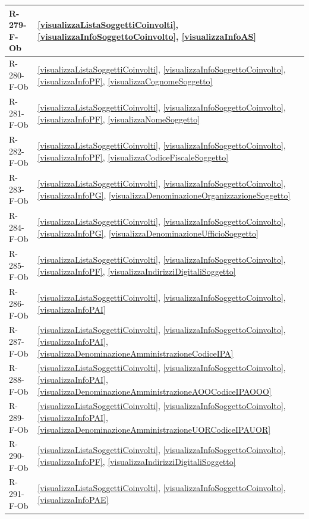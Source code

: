 \begin{longtable}{|p{4cm}|p{10cm}|}
\hline
R-279-F-Ob & \ref{visualizzaListaSoggettiCoinvolti}, \ref{visualizzaInfoSoggettoCoinvolto}, \ref{visualizzaInfoAS} \\
\hline
R-280-F-Ob & \ref{visualizzaListaSoggettiCoinvolti}, \ref{visualizzaInfoSoggettoCoinvolto}, \ref{visualizzaInfoPF}, \ref{visualizzaCognomeSoggetto} \\
\hline
R-281-F-Ob & \ref{visualizzaListaSoggettiCoinvolti}, \ref{visualizzaInfoSoggettoCoinvolto}, \ref{visualizzaInfoPF}, \ref{visualizzaNomeSoggetto} \\
\hline
R-282-F-Ob & \ref{visualizzaListaSoggettiCoinvolti}, \ref{visualizzaInfoSoggettoCoinvolto}, \ref{visualizzaInfoPF}, \ref{visualizzaCodiceFiscaleSoggetto} \\
\hline
R-283-F-Ob & \ref{visualizzaListaSoggettiCoinvolti}, \ref{visualizzaInfoSoggettoCoinvolto}, \ref{visualizzaInfoPG}, \ref{visualizzaDenominazioneOrganizzazioneSoggetto} \\
\hline
R-284-F-Ob & \ref{visualizzaListaSoggettiCoinvolti}, \ref{visualizzaInfoSoggettoCoinvolto}, \ref{visualizzaInfoPG}, \ref{visualizzaDenominazioneUfficioSoggetto} \\
\hline
R-285-F-Ob & \ref{visualizzaListaSoggettiCoinvolti}, \ref{visualizzaInfoSoggettoCoinvolto}, \ref{visualizzaInfoPF}, \ref{visualizzaIndirizziDigitaliSoggetto} \\
\hline
R-286-F-Ob & \ref{visualizzaListaSoggettiCoinvolti}, \ref{visualizzaInfoSoggettoCoinvolto}, \ref{visualizzaInfoPAI} \\
\hline
R-287-F-Ob & \ref{visualizzaListaSoggettiCoinvolti}, \ref{visualizzaInfoSoggettoCoinvolto}, \ref{visualizzaInfoPAI}, \ref{visualizzaDenominazioneAmministrazioneCodiceIPA} \\
\hline
R-288-F-Ob & \ref{visualizzaListaSoggettiCoinvolti}, \ref{visualizzaInfoSoggettoCoinvolto}, \ref{visualizzaInfoPAI}, \ref{visualizzaDenominazioneAmministrazioneAOOCodiceIPAOOO} \\
\hline
R-289-F-Ob & \ref{visualizzaListaSoggettiCoinvolti}, \ref{visualizzaInfoSoggettoCoinvolto}, \ref{visualizzaInfoPAI}, \ref{visualizzaDenominazioneAmministrazioneUORCodiceIPAUOR} \\
\hline
R-290-F-Ob & \ref{visualizzaListaSoggettiCoinvolti}, \ref{visualizzaInfoSoggettoCoinvolto}, \ref{visualizzaInfoPF}, \ref{visualizzaIndirizziDigitaliSoggetto} \\
\hline
R-291-F-Ob & \ref{visualizzaListaSoggettiCoinvolti}, \ref{visualizzaInfoSoggettoCoinvolto}, \ref{visualizzaInfoPAE} \\

\end{longtable}
